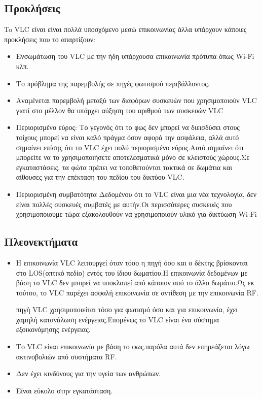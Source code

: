 \documentclass[conference]{IEEEtran}
\begin{document}
\subsection{Προκλήσεις \cite{b5}}
To VLC είναι είναι πολλά υποσχόμενο μεσώ επικοινωνίας άλλα υπάρχουν κάποιες προκλήσεις που το απαρτίζουν:
\begin{itemize}
	\item  Ενσωμάτωση του VLC με την ήδη υπάρχουσα επικοινωνία πρότυπα όπως Wi-Fi κλπ.
	\item Το πρόβλημα της παρεμβολής σε πηγές φωτισμού περιβάλλοντος.
	\item  Αναμένεται παρεμβολή μεταξύ των διαφόρων συσκευών που χρησιμοποιούν VLC
γιατί στο  μέλλον θα  υπάρχει αύξηση του αριθμού των συσκευών VLC
	\item Περιορισμένο εύρος:
Το γεγονός ότι το φως δεν μπορεί να διεισδύσει στους τοίχους μπορεί να είναι καλό πράγμα όσον αφορά την ασφάλεια, αλλά αυτό σημαίνει επίσης ότι το VLC έχει πολύ περιορισμένο εύρος.Αυτό σημαίνει ότι μπορείτε να το χρησιμοποιήσετε αποτελεσματικά μόνο σε κλειστούς χώρους.Σε εγκαταστάσεις, τα φώτα πρέπει να τοποθετούνται τακτικά σε δωμάτια και αίθουσες για την επέκταση του πεδίου του δικτύου VLC.
	\item Περιορισμένη συμβατότητα
Δεδομένου ότι το VLC είναι μια νέα τεχνολογία, δεν είναι πολλές συσκευές συμβατές με αυτήν.Οι περισσότερες συσκευές που χρησιμοποιούμε τώρα εξακολουθούν να χρησιμοποιούν υλικό για δικτύωση Wi-Fi
\end{itemize}

\subsection{Πλεονεκτήματα \cite{b8}}

\begin{itemize}
\item Η επικοινωνία VLC λειτουργεί όταν τόσο η πηγή όσο και ο δέκτης βρίσκονται στο LOS(οπτικό πεδίο) εντός του ίδιου δωματίου.Η επικοινωνία δεδομένων με βάση το VLC δεν μπορεί να υποκλαπεί από κάποιον από το άλλο δωμάτιο.Ως εκ τούτου, το VLC παρέχει ασφαλή επικοινωνία σε αντίθεση με την επικοινωνία RF.


 πηγή VLC χρησιμοποιείται τόσο για φωτισμό όσο και για επικοινωνία, έχει χαμηλή κατανάλωση ενέργειας.Επομένως  το VLC είναι ένα σύστημα εξοικονόμησης ενέργειας.


\item Το VLC είναι επικοινωνία με βάση το φως.παρόλα αυτά  δεν επηρεάζεται λόγω ακτινοβολιών από συστήματα RF.

\item Δεν έχει κινδύνους για την υγεία των ανθρώπων.

\item Είναι εύκολο στην εγκατάσταση.
\end{itemize}
\end{document}
